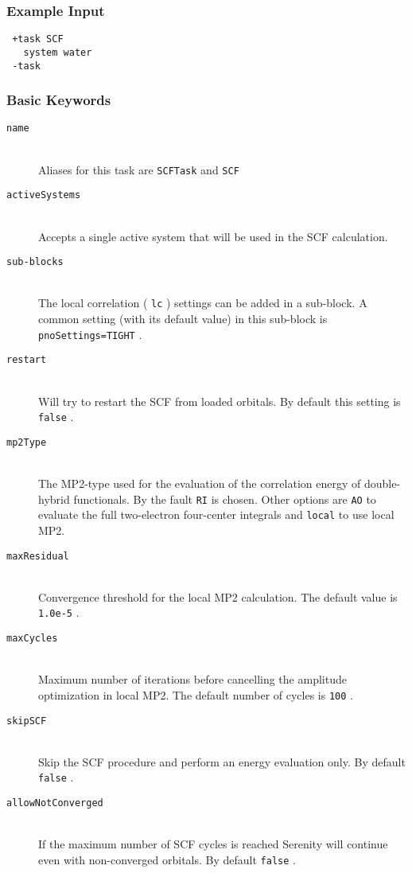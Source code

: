 \documentclass[bibliography=totocnumbered,a4paper,10pt,oneside]{scrbook}
\newcommand{\ttt}[1]{%
  \begingroup\setlength{\fboxsep}{1pt}%
  \colorbox{serenity-green!30}{\texttt{\hspace*{2pt}\vphantom{(g}#1\hspace*{2pt}}}%
  \endgroup
}
\begin{document}
\subsubsection{Example Input}
\begin{lstlisting}
 +task SCF
   system water
 -task
\end{lstlisting}
\subsubsection{Basic Keywords}
\begin{description}
	\item[\texttt{name}]\hfill \\
	Aliases for this task are \ttt{SCFTask} and \ttt{SCF}
	\item[\texttt{activeSystems}]\hfill \\
	Accepts a single active system that will be used in the SCF calculation.
	\item[\texttt{sub-blocks}]\hfill \\
	The local correlation (\ttt{lc}) settings can be added in a sub-block. A common setting (with its default value) in this sub-block is \ttt{pnoSettings=TIGHT}.	
	\item[\texttt{restart}]\hfill \\
	Will try to restart the SCF from loaded orbitals. By default this setting is \ttt{false}.
	\item[\texttt{mp2Type}]\hfill \\
	The MP2-type used for the evaluation of the correlation energy of double-hybrid functionals. By the fault \ttt{RI} is chosen. Other options are \ttt{AO} to evaluate the full two-electron four-center integrals and \ttt{local} to use local MP2.
	\item[\texttt{maxResidual}]\hfill \\
	Convergence threshold for the local MP2 calculation. The default value is \ttt{1.0e-5}.
	\item[\texttt{maxCycles}]\hfill \\
	Maximum number of iterations before cancelling the amplitude optimization in local MP2. The default number of cycles is \ttt{100}.
	\item[\texttt{skipSCF}]\hfill \\
	Skip the SCF procedure and perform an energy evaluation only. By default \ttt{false}.
	\item[\texttt{allowNotConverged}]\hfill \\
  If the maximum number of SCF cycles is reached Serenity will continue even with non-converged orbitals. By default \ttt{false}.

\end{description}
\end{document}
